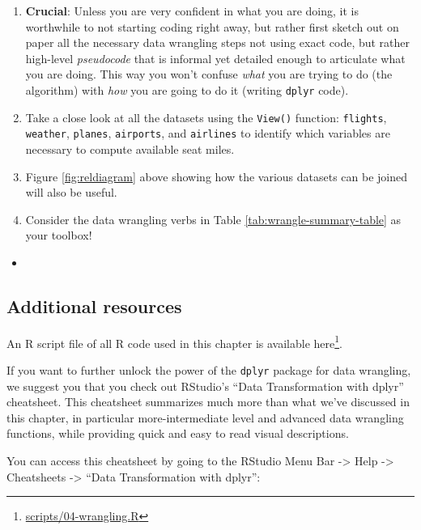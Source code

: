 \documentclass[12pt, krantz2,]{krantz}
\providecommand{\tightlist}{%
  \setlength{\itemsep}{0pt}\setlength{\parskip}{0pt}}
\renewcommand{\href}[2]{#2\footnote{\url{#1}}}
\newenvironment{rmdblock}[1]
  {\begin{shaded*}
  \begin{itemize}
  \renewcommand{\labelitemi}{
    \raisebox{-.7\height}[0pt][0pt]{
    }
  }
  \item
  }
  {
  \end{itemize}
  \end{shaded*}
  }
\newenvironment{learncheck}
  {\begin{rmdblock}{warning}}
  {\end{rmdblock}}
\begin{document}
\begin{enumerate}
\def\labelenumi{\arabic{enumi}.}
\tightlist
\item
  \textbf{Crucial}: Unless you are very confident in what you are doing, it is worthwhile to not starting coding right away, but rather first sketch out on paper all the necessary data wrangling steps not using exact code, but rather high-level \emph{pseudocode} that is informal yet detailed enough to articulate what you are doing. This way you won't confuse \emph{what} you are trying to do (the algorithm) with \emph{how} you are going to do it (writing \texttt{dplyr} code).
\item
  Take a close look at all the datasets using the \texttt{View()} function: \texttt{flights}, \texttt{weather}, \texttt{planes}, \texttt{airports}, and \texttt{airlines} to identify which variables are necessary to compute available seat miles.
\item
  Figure \ref{fig:reldiagram} above showing how the various datasets can be joined will also be useful.
\item
  Consider the data wrangling verbs in Table \ref{tab:wrangle-summary-table} as your toolbox!
\end{enumerate}

\begin{learncheck}

\end{learncheck}

\hypertarget{additional-resources-2}{%
\subsection{Additional resources}\label{additional-resources-2}}

An R script file of all R code used in this chapter is available \href{scripts/04-wrangling.R}{here}.

If you want to further unlock the power of the \texttt{dplyr} package for data wrangling, we suggest you that you check out RStudio's ``Data Transformation with dplyr'' cheatsheet. This cheatsheet summarizes much more than what we've discussed in this chapter, in particular more-intermediate level and advanced data wrangling functions, while providing quick and easy to read visual descriptions.

You can access this cheatsheet by going to the RStudio Menu Bar -\textgreater{} Help -\textgreater{} Cheatsheets -\textgreater{} ``Data Transformation with dplyr'':
\end{document}
